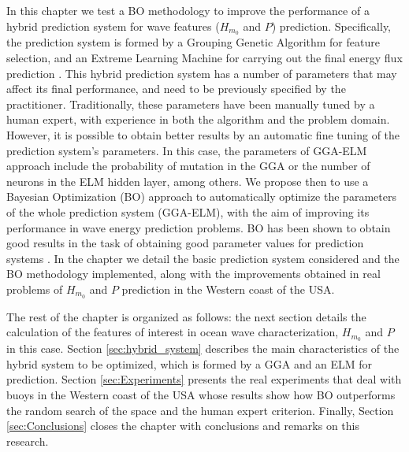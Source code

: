 In this chapter we test a BO methodology to improve the performance of a hybrid prediction system for wave features ($H_{m_0}$ and $P$) prediction. Specifically, the prediction system is formed by a Grouping Genetic Algorithm for feature selection, and an Extreme Learning Machine for carrying out the final energy flux prediction \citep{cornejo2016significant}. This hybrid prediction system has a number of parameters that may affect its final performance, and need to be previously specified by the practitioner. Traditionally, these parameters have been manually tuned by a human expert, with experience in both the algorithm and the problem domain. However, it is possible to obtain better results by an automatic fine tuning of the prediction system's parameters. In this case, the parameters of GGA-ELM approach include the probability of mutation in the GGA or the number of neurons in the ELM hidden layer, among others. We propose then to use a Bayesian Optimization (BO) approach to automatically optimize the parameters of the whole prediction system (GGA-ELM), with the aim of improving its performance in wave energy prediction problems. BO has been shown to obtain good results in the task of obtaining good parameter values for prediction systems \citep{snoek2012practical}. In the chapter we detail the basic prediction system considered and the BO methodology implemented, along with the improvements obtained in real problems of $H_{m_0}$ and $P$ prediction in the Western coast of the USA.

The rest of the chapter is organized as follows: the next section details the calculation of the features of interest in ocean wave characterization, $H_{m_0}$ and $P$ in this case. Section \ref{sec:hybrid_system} describes the main characteristics of the hybrid system to be optimized, which is formed by a GGA and an ELM for prediction. Section \ref{sec:Experiments} presents the real experiments that deal with buoys in the Western coast of the USA whose results show how BO outperforms the random search of the space and the human expert criterion. Finally, Section \ref{sec:Conclusions} closes the chapter with conclusions and remarks on this research.

